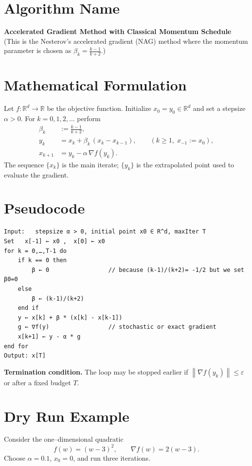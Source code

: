 \documentclass{article}
\newcommand{\norm}[1]{\left\|#1\right\|}
\newcommand{\grad}{\nabla}
\newcommand{\R}{\mathbb{R}}
\begin{document}
\section*{Algorithm Name}
\textbf{Accelerated Gradient Method with Classical Momentum Schedule}\\
(This is the Nesterov’s accelerated gradient (NAG) method where the momentum
parameter is chosen as $\displaystyle \beta_k=\frac{k-1}{k+2}$.)

\section*{Mathematical Formulation}
Let $f:\R^d\to\R$ be the objective function.  
Initialize $x_{0}=y_{0}\in\R^{d}$ and set a stepsize $\alpha>0$.  
For $k=0,1,2,\dots$ perform
\[
\boxed{
\begin{aligned}
\beta_k &:= \frac{k-1}{k+2},\\[4pt]
y_k    &= x_k + \beta_k\,(x_k-x_{k-1}), \qquad (k\ge 1,\;x_{-1}:=x_0),\\[4pt]
x_{k+1}&= y_k - \alpha\,\grad f(y_k).
\end{aligned}}
\]
The sequence $\{x_k\}$ is the main iterate; $\{y_k\}$ is the
extrapolated point used to evaluate the gradient.

\section*{Pseudocode}
\begin{verbatim}
Input:   stepsize α > 0, initial point x0 ∈ R^d, maxIter T
Set   x[-1] ← x0 ,  x[0] ← x0
for k = 0,…,T-1 do
    if k == 0 then
        β ← 0                 // because (k-1)/(k+2)= -1/2 but we set β0=0
    else
        β ← (k-1)/(k+2)
    end if
    y ← x[k] + β * (x[k] - x[k-1])
    g ← ∇f(y)                 // stochastic or exact gradient
    x[k+1] ← y - α * g
end for
Output: x[T]
\end{verbatim}

\noindent
\textbf{Termination condition.}  The loop may be stopped earlier if
$\norm{\grad f(y_k)}\le \varepsilon$ or after a fixed budget $T$.

\section*{Dry Run Example}
Consider the one–dimensional quadratic
\[
f(w) = (w-3)^2 ,\qquad \grad f(w)=2(w-3).
\]
Choose $\alpha=0.1$, $x_0=0$, and run three iterations.
\end{document}
